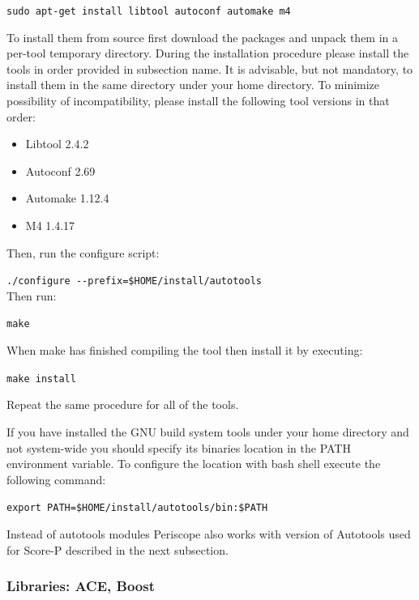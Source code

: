 \documentclass[11pt,a4paper, oneside]{book} %
\newcommand{\installloc}[1]{\$HOME/install/#1}
\begin{document}
\texttt{sudo apt-get install libtool autoconf automake m4}

To install them from source first download the packages and unpack them in a
per-tool temporary directory. During the installation procedure please install
the tools in order provided in subsection name. It is advisable, but not
mandatory, to install them in the same directory under your home directory.
To minimize possibility of incompatibility, please install the following tool
versions in that order:

 \begin{itemize}
  \item Libtool 2.4.2
  \item Autoconf 2.69
  \item Automake 1.12.4
  \item M4 1.4.17
 \end{itemize}

Then, run the configure script:

\texttt{./configure -{}-prefix=\installloc{autotools}} \\

Then run:

\texttt{make}

When make has finished compiling the tool then install it by executing:

\texttt{make install}

Repeat the same procedure for all of the tools.

If you have installed the GNU build system tools under your home directory and
not system-wide you should specify its binaries location in the PATH environment
variable. To configure the location with bash shell execute the following
command:

\texttt{export PATH=\installloc{autotools/bin}:\$PATH}

Instead of autotools modules Periscope also works with version of Autotools used
for Score-P described in the next subsection.



\subsubsection{Libraries: ACE, Boost}
\end{document}
